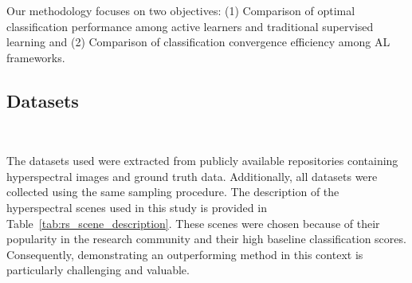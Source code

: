 \documentclass[remotesensing,article,submit,moreauthors,pdftex]{Definitions/mdpi}
\begin{document}
Our methodology focuses on two objectives: (1) Comparison of optimal
classification performance among active learners and traditional supervised
learning and (2) Comparison of classification convergence efficiency among AL
frameworks.

\subsection{Datasets}~\label{sec:datasets}

The datasets used were extracted from publicly available repositories
containing hyperspectral images and ground truth data. Additionally, all
datasets were collected using the same sampling procedure. The description of
the hyperspectral scenes used in this study is provided in
Table~\ref{tab:rs_scene_description}. These scenes were chosen because of
their popularity in the research community and their high baseline
classification scores. Consequently, demonstrating an outperforming method in
this context is particularly challenging and valuable.
\end{document}
